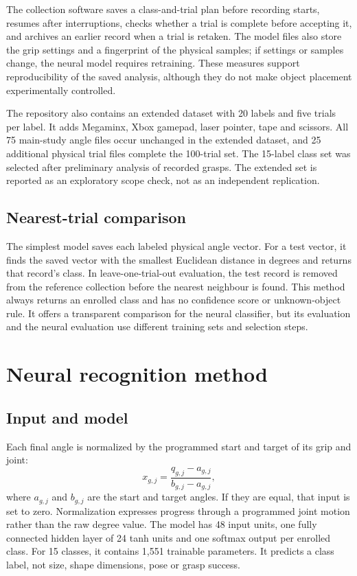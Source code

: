 \documentclass[12pt,a4paper]{article}
\begin{document}
The collection software saves a class-and-trial plan before recording starts, resumes after interruptions, checks whether a trial is complete before accepting it, and archives an earlier record when a trial is retaken. The model files also store the grip settings and a fingerprint of the physical samples; if settings or samples change, the neural model requires retraining. These measures support reproducibility of the saved analysis, although they do not make object placement experimentally controlled.

The repository also contains an extended dataset with 20 labels and five trials per label. It adds Megaminx, Xbox gamepad, laser pointer, tape and scissors. All 75 main-study angle files occur unchanged in the extended dataset, and 25 additional physical trial files complete the 100-trial set. The 15-label class set was selected after preliminary analysis of recorded grasps. The extended set is reported as an exploratory scope check, not as an independent replication.

\subsection{Nearest-trial comparison}

The simplest model saves each labeled physical angle vector. For a test vector, it finds the saved vector with the smallest Euclidean distance in degrees and returns that record's class. In leave-one-trial-out evaluation, the test record is removed from the reference collection before the nearest neighbour is found. This method always returns an enrolled class and has no confidence score or unknown-object rule. It offers a transparent comparison for the neural classifier, but its evaluation and the neural evaluation use different training sets and selection steps.

\section{Neural recognition method}

\subsection{Input and model}

Each final angle is normalized by the programmed start and target of its grip and joint:
\begin{equation}
x_{g,j}=\frac{q_{g,j}-a_{g,j}}{b_{g,j}-a_{g,j}},
\end{equation}
where $a_{g,j}$ and $b_{g,j}$ are the start and target angles. If they are equal, that input is set to zero. Normalization expresses progress through a programmed joint motion rather than the raw degree value. The model has 48 input units, one fully connected hidden layer of 24 tanh units and one softmax output per enrolled class. For 15 classes, it contains 1,551 trainable parameters. It predicts a class label, not size, shape dimensions, pose or grasp success.
\end{document}
